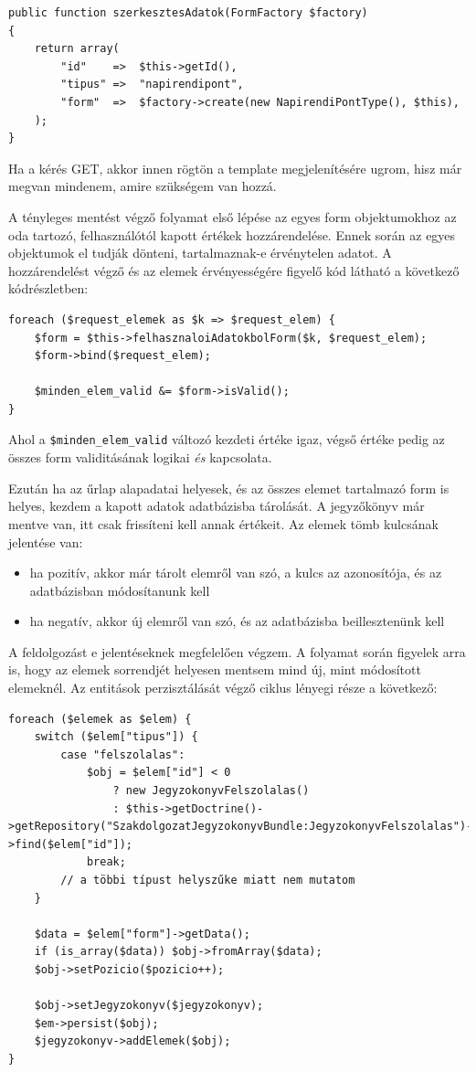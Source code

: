 \documentclass[a4paper,12pt,oneside]{report}
\begin{document}
\begin{lstlisting}
public function szerkesztesAdatok(FormFactory $factory)
{
    return array(
        "id"    =>  $this->getId(),
        "tipus" =>  "napirendipont",
        "form"  =>  $factory->create(new NapirendiPontType(), $this),
    );
}
\end{lstlisting}

Ha a kérés GET, akkor innen rögtön a template megjelenítésére ugrom, hisz már megvan mindenem, amire szükségem van hozzá.

A tényleges mentést végző folyamat első lépése az egyes form objektumokhoz az oda tartozó, felhasználótól kapott értékek hozzárendelése. Ennek során az egyes objektumok el tudják dönteni, tartalmaznak-e érvénytelen adatot. A hozzárendelést végző és az elemek érvényességére figyelő kód látható a következő kódrészletben:

\begin{lstlisting}
foreach ($request_elemek as $k => $request_elem) {
    $form = $this->felhasznaloiAdatokbolForm($k, $request_elem);
    $form->bind($request_elem);

    $minden_elem_valid &= $form->isValid();
}
\end{lstlisting}

Ahol a {\tt \$minden\_elem\_valid} változó kezdeti értéke igaz, végső értéke pedig az összes form validitásának logikai {\it és} kapcsolata.

Ezután ha az űrlap alapadatai helyesek, és az összes elemet tartalmazó form is helyes, kezdem a kapott adatok adatbázisba tárolását. A jegyzőkönyv már mentve van, itt csak frissíteni kell annak értékeit. Az elemek tömb kulcsának jelentése van:

\begin{itemize}
    \item ha pozitív, akkor már tárolt elemről van szó, a kulcs az azonosítója, és az adatbázisban módosítanunk kell
    \item ha negatív, akkor új elemről van szó, és az adatbázisba beillesztenünk kell
\end{itemize}

A feldolgozást e jelentéseknek megfelelően végzem. A folyamat során figyelek arra is, hogy az elemek sorrendjét helyesen mentsem mind új, mint módosított elemeknél. Az entitások perzisztálását végző ciklus lényegi része a következő:

\begin{lstlisting}
foreach ($elemek as $elem) {
    switch ($elem["tipus"]) {
        case "felszolalas":
            $obj = $elem["id"] < 0
                ? new JegyzokonyvFelszolalas()
                : $this->getDoctrine()->getRepository("SzakdolgozatJegyzokonyvBundle:JegyzokonyvFelszolalas")->find($elem["id"]);
            break;
        // a többi típust helyszűke miatt nem mutatom
    }

    $data = $elem["form"]->getData();
    if (is_array($data)) $obj->fromArray($data);
    $obj->setPozicio($pozicio++);

    $obj->setJegyzokonyv($jegyzokonyv);
    $em->persist($obj);
    $jegyzokonyv->addElemek($obj);
}
\end{lstlisting}
\end{document}

